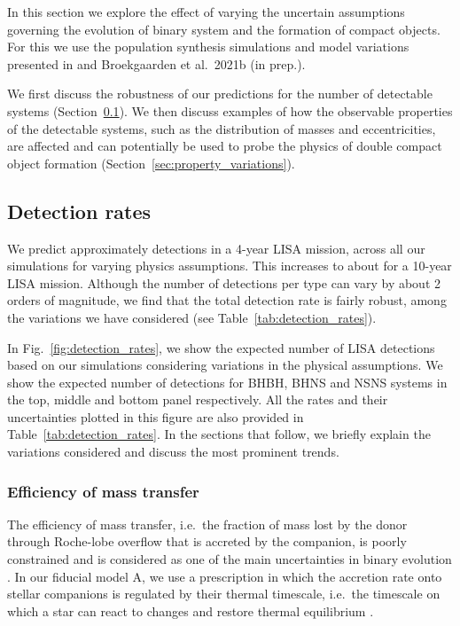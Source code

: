 In this section we explore the effect of varying the uncertain assumptions governing the evolution of binary system and the formation of compact objects. For this we use the population synthesis simulations and model variations presented in \citet{Broekgaarden+2021} and Broekgaarden et al.\ 2021b (in prep.).

We first discuss the robustness of our predictions for the number of detectable systems (Section~\ref{sec:detection_rate_analysis}). We then discuss examples of how the observable properties of the detectable systems, such as the distribution of masses and eccentricities, are affected and can potentially be used to probe the physics of double compact object formation (Section~\ref{sec:property_variations}).

\subsection{Detection rates}\label{sec:detection_rate_analysis}
We predict approximately \rangeFourYear{} detections in a 4-year LISA mission, across all our simulations for varying physics assumptions. This increases to about \rangeTenYear{} for a 10-year LISA mission. Although the number of detections per type can vary by about 2 orders of magnitude, we find that the total detection rate is fairly robust, among the variations we have considered (see Table~\ref{tab:detection_rates}).

In Fig.~\ref{fig:detection_rates}, we show the expected number of LISA detections based on our simulations considering variations in the physical assumptions. We show the expected number of detections for BHBH, BHNS and NSNS systems in the top, middle and bottom panel respectively. All the rates and their uncertainties plotted in this figure are also provided in Table~\ref{tab:detection_rates}. 
In the sections that follow, we briefly explain the variations considered and discuss the most prominent trends. 

\subsubsection{Efficiency of mass transfer}

The efficiency of mass transfer, i.e.\ the fraction of mass lost by the donor through Roche-lobe overflow that is accreted by the companion, is poorly constrained and is considered as one of the main uncertainties in binary evolution \citep[e.g.][]{deMink+2007}. In our fiducial model A, we use a prescription in which the accretion rate onto stellar companions is regulated by their thermal timescale, i.e.\ the timescale on which a star can react to changes and restore thermal equilibrium \citep[see e.g.\ ][]{Schneider+2015}. 

